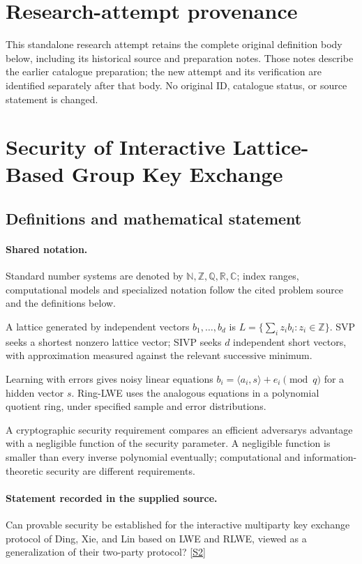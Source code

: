 \documentclass[11pt]{article}
\begin{document}
\section*{Research-attempt provenance}
This standalone research attempt retains the complete original definition body below,
including its historical source and preparation notes. Those notes describe the
earlier catalogue preparation; the new attempt and its verification are identified
separately after that body. No original ID, catalogue status, or source statement is changed.

\section{Security of Interactive Lattice-Based Group Key Exchange}\label{statement}

\subsection{Definitions and mathematical statement}

\paragraph{Shared notation.}Standard number systems are denoted by $\mathbb N,\mathbb Z,\mathbb Q,\mathbb R,\mathbb C$; index ranges, computational models and specialized notation follow the cited problem source and the definitions below.


A lattice generated by independent vectors $b_1,\ldots,b_d$ is $L=\{\sum_i z_i b_i:z_i\in\mathbb Z\}$. SVP seeks a shortest nonzero lattice vector; SIVP seeks $d$ independent short vectors, with approximation measured against the relevant successive minimum.

Learning with errors gives noisy linear equations $b_i=\langle a_i,s\rangle+e_i\pmod q$ for a hidden vector $s$. Ring-LWE uses the analogous equations in a polynomial quotient ring, under specified sample and error distributions.

A cryptographic security requirement compares an efficient adversary\textquotesingle s advantage with a negligible function of the security parameter. A negligible function is smaller than every inverse polynomial eventually; computational and information-theoretic security are different requirements.
\paragraph{Statement recorded in the supplied source.}
Can provable security be established for the interactive multiparty key exchange protocol of Ding, Xie, and Lin based on LWE and RLWE, viewed as a generalization of their two-party protocol? \href{https://doi.org/10.4171/owr/2017/5}{[S2]}
\end{document}
